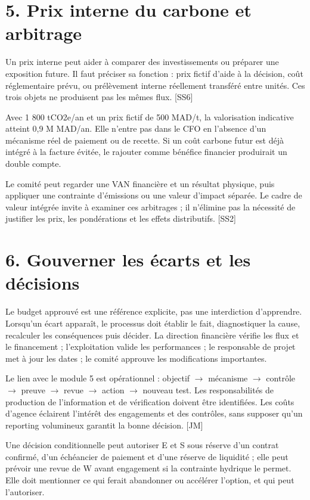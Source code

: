 \documentclass[12pt,a4paper]{article}
\begin{document}
\section*{5. Prix interne du carbone et arbitrage}
Un prix interne peut aider à comparer des investissements ou préparer une exposition future. Il faut préciser sa fonction : prix fictif d’aide à la décision, coût réglementaire prévu, ou prélèvement interne réellement transféré entre unités. Ces trois objets ne produisent pas les mêmes flux. [SS6]


Avec 1 800 tCO2e/an et un prix fictif de 500 MAD/t, la valorisation indicative atteint 0,9 M MAD/an. Elle n’entre pas dans le CFO en l’absence d’un mécanisme réel de paiement ou de recette. Si un coût carbone futur est déjà intégré à la facture évitée, le rajouter comme bénéfice financier produirait un double compte.


Le comité peut regarder une VAN financière et un résultat physique, puis appliquer une contrainte d’émissions ou une valeur d’impact séparée. Le cadre de valeur intégrée invite à examiner ces arbitrages ; il n’élimine pas la nécessité de justifier les prix, les pondérations et les effets distributifs. [SS2]

\section*{6. Gouverner les écarts et les décisions}
Le budget approuvé est une référence explicite, pas une interdiction d’apprendre. Lorsqu’un écart apparaît, le processus doit établir le fait, diagnostiquer la cause, recalculer les conséquences puis décider. La direction financière vérifie les flux et le financement ; l’exploitation valide les performances ; le responsable de projet met à jour les dates ; le comité approuve les modifications importantes.


Le lien avec le module 5 est opérationnel : objectif $\rightarrow$ mécanisme $\rightarrow$ contrôle $\rightarrow$ preuve $\rightarrow$ revue $\rightarrow$ action $\rightarrow$ nouveau test. Les responsabilités de production de l’information et de vérification doivent être identifiées. Les coûts d’agence éclairent l’intérêt des engagements et des contrôles, sans supposer qu’un reporting volumineux garantit la bonne décision. [JM]


Une décision conditionnelle peut autoriser E et S sous réserve d’un contrat confirmé, d’un échéancier de paiement et d’une réserve de liquidité ; elle peut prévoir une revue de W avant engagement si la contrainte hydrique le permet. Elle doit mentionner ce qui ferait abandonner ou accélérer l’option, et qui peut l’autoriser.
\end{document}
